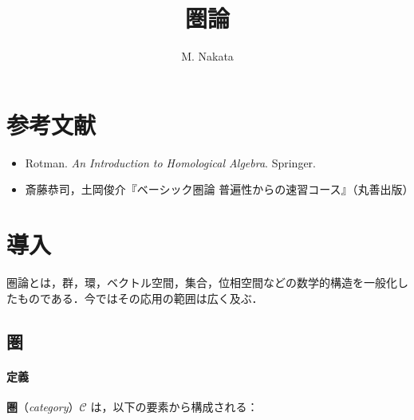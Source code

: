 \documentclass[pandoc,base=10pt,b5j,precisetext]{bxjsarticle}
\title{圏論}
\author{M. Nakata}
\date{}
\providecommand{\tightlist}{%
  \setlength{\itemsep}{0pt}\setlength{\parskip}{0pt}}
\let\oldparagraph\paragraph
\renewcommand{\paragraph}[1]{\oldparagraph{#1}\mbox{}}
\begin{document}
\maketitle

{
\setcounter{tocdepth}{3}
\tableofcontents
}
\newcommand{\deli}{\,:\,}
\newcommand{\bb}[1]{\boldsymbol{#1}}
\renewcommand{\i}{\mathrm{i}}
\renewcommand{\bar}[1]{\overline{#1}}
\renewcommand{\le}{\leqslant}
\renewcommand{\ge}{\geqslant}
\newcommand{\qset}[2]{{#1}/\!\,{#2}}
\newcommand{\scr}[1]{\mathscr{#1}}
\renewcommand{\cal}[1]{\mathcal{#1}}
\newcommand{\pfrac}[2]{\frac{\partial #1}{\partial #2}}
\newcommand{\card}{\mathop{\mathrm{card}}\nolimits}
\newcommand{\Span}{\mathop{\mathrm{span}}}
\newcommand{\obj}{\mathop{\mathrm{obj}}}
\newcommand{\Hom}{\mathop{\mathrm{Hom}}}

\hypertarget{ux53c2ux8003ux6587ux732e}{%
\section{参考文献}\label{ux53c2ux8003ux6587ux732e}}

\begin{itemize}
\tightlist
\item
  Rotman. \emph{An Introduction to Homological Algebra}. Springer.
\item
  斎藤恭司，土岡俊介『ベーシック圏論
  普遍性からの速習コース』（丸善出版）
\end{itemize}

\hypertarget{topology-introduction}{%
\section{導入}\label{topology-introduction}}

圏論とは，群，環，ベクトル空間，集合，位相空間などの数学的構造を一般化したものである．今ではその応用の範囲は広く及ぶ．

\hypertarget{ux570f}{%
\subsection{圏}\label{ux570f}}

\hypertarget{ux5b9aux7fa9}{%
\paragraph{定義}\label{ux5b9aux7fa9}}

\textbf{圏}（\emph{category}）\(\scr C\) は，以下の要素から構成される：
\end{document}
